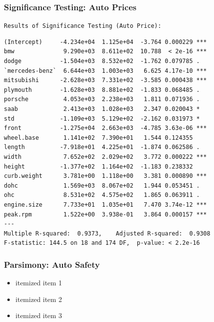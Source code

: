\documentclass{beamer}
\begin{document}
\begin{frame}[fragile]
\frametitle{Significance Testing: Auto Prices}
\texttt{Results of Significance Testing (Auto Price):}\\
\tiny{ 
\begin{verbatim}
(Intercept)     -4.234e+04  1.125e+04  -3.764 0.000229 ***
bmw              9.290e+03  8.611e+02  10.788  < 2e-16 ***
dodge           -1.504e+03  8.532e+02  -1.762 0.079785 .  
`mercedes-benz`  6.644e+03  1.003e+03   6.625 4.17e-10 ***
mitsubishi      -2.628e+03  7.331e+02  -3.585 0.000438 ***
plymouth        -1.628e+03  8.881e+02  -1.833 0.068485 .  
porsche          4.053e+03  2.238e+03   1.811 0.071936 .  
saab             2.413e+03  1.028e+03   2.347 0.020043 *  
std             -1.109e+03  5.129e+02  -2.162 0.031973 *  
front           -1.275e+04  2.663e+03  -4.785 3.63e-06 ***
wheel.base       1.141e+02  7.390e+01   1.544 0.124355    
length          -7.918e+01  4.225e+01  -1.874 0.062586 .  
width            7.652e+02  2.029e+02   3.772 0.000222 ***
height          -1.377e+02  1.164e+02  -1.183 0.238332    
curb.weight      3.781e+00  1.118e+00   3.381 0.000890 ***
dohc             1.569e+03  8.067e+02   1.944 0.053451 .  
ohc              8.531e+02  4.575e+02   1.865 0.063911 .  
engine.size      7.733e+01  1.035e+01   7.470 3.74e-12 ***
peak.rpm         1.522e+00  3.938e-01   3.864 0.000157 ***
---
Multiple R-squared:  0.9373,	Adjusted R-squared:  0.9308 
F-statistic: 144.5 on 18 and 174 DF,  p-value: < 2.2e-16  
\end{verbatim}
}
\end{frame}

\begin{frame}
\frametitle{Parsimony: Auto Safety}
\begin{itemize}
  \item itemized item 1
  \item itemized item 2
  \item itemized item 3
\end{itemize}

\end{frame}
\end{document}
